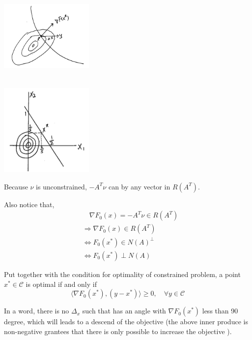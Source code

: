 \begin{marginfigure}
	\centering
	\includegraphics[width=1.8in,height=1.8in]{figures/ch10/figure1204_3.png}
\end{marginfigure}

\begin{marginfigure}
	\centering
	\includegraphics[width=1.8in,height=1.8in]{figures/ch10/figure1204_4.png}
\end{marginfigure}

Because $\nu$ is unconstrained, $-A^{T}\nu$ can by any vector in $R(A^T)$.

Also notice that,
\begin{align*}
&\quad \nabla F_0(x) = -A^T\nu\in R(A^T) \\
&\Rightarrow \nabla F_0(x)\in R(A^T) \\
&\Leftrightarrow F_0(x^*) \in N(A)^{\perp} \\
&\Leftrightarrow F_0(x^*) \perp N(A)
\end{align*}


Put together with the condition for optimality of constrained problem, a point $x^*\in\mathcal{C}$ is optimal if and only if 
$$\langle\nabla F_0(x^*), (y-x^*)\rangle\geq 0,\quad \forall y\in\mathcal{C}$$

In a word, there is no $\Delta_x$ such that has an angle with $\nabla F_0(x^*)$ less than 90 degree, which will leads to a descend of the objective (the above inner produce is non-negative grantees that there is only possible to increase the objective ).









